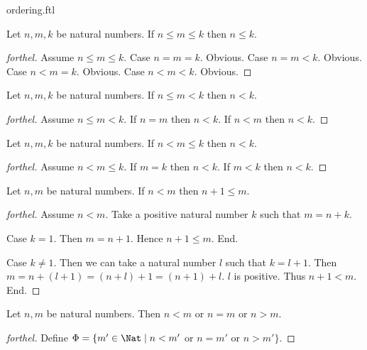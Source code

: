 \documentclass{naproche-library}
\begin{document}
\begin{smodule}{ordering.ftl}
  \begin{proposition}[forthel,id=ARITHMETIC_04_5480385953660928]
    Let $n, m, k$ be natural numbers.
    If $n \leq m \leq k$ then $n \leq k$.
  \end{proposition}
  \begin{proof}[forthel]
    Assume $n \leq m \leq k$.
    Case $n = m = k$. Obvious.
    Case $n = m < k$. Obvious.
    Case $n < m = k$. Obvious.
    Case $n < m < k$. Obvious.
  \end{proof}

  \begin{proposition}[forthel,id=ARITHMETIC_04_5098403656630272]
    Let $n, m, k$ be natural numbers.
    If $n \leq m < k$ then $n < k$.
  \end{proposition}
  \begin{proof}[forthel]
    Assume $n \leq m < k$.
    If $n = m$ then $n < k$.
    If $n < m$ then $n < k$.
  \end{proof}

  \begin{proposition}[forthel,id=ARITHMETIC_04_4809599527944192]
    Let $n, m, k$ be natural numbers.
    If $n < m \leq k$ then $n < k$.
  \end{proposition}
  \begin{proof}[forthel]
    Assume $n < m \leq k$.
    If $m = k$ then $n < k$.
    If $m < k$ then $n < k$.
  \end{proof}

  \begin{proposition}[forthel,id=ARITHMETIC_04_8584998051381248]
    Let $n, m$ be natural numbers.
    If $n < m$ then $n + 1 \leq m$.
  \end{proposition}
  \begin{proof}[forthel]
    Assume $n < m$.
    Take a positive natural number $k$ such that $m = n + k$.

    Case $k = 1$.
      Then $m = n + 1$.
      Hence $n + 1 \leq m$.
    End.

    Case $k \neq 1$.
      Then we can take a natural number $l$ such that $k = l + 1$.
      Then $m
        = n + (l + 1)
        = (n + l) + 1
        = (n + 1) + l$.
      $l$ is positive.
      Thus $n + 1 < m$.
    End.
  \end{proof}

  \begin{proposition}[forthel,id=ARITHMETIC_04_8201937860165632]
    Let $n, m$ be natural numbers.
    Then $n < m$ or $n = m$ or $n > m$.
  \end{proposition}
  \begin{proof}[forthel]
    Define $\Phi = \{ m' \in \Nat \mid n < m'$ or $n = m'$ or $n > m' \}$.


\end{proof}
\end{smodule}
\end{document}
